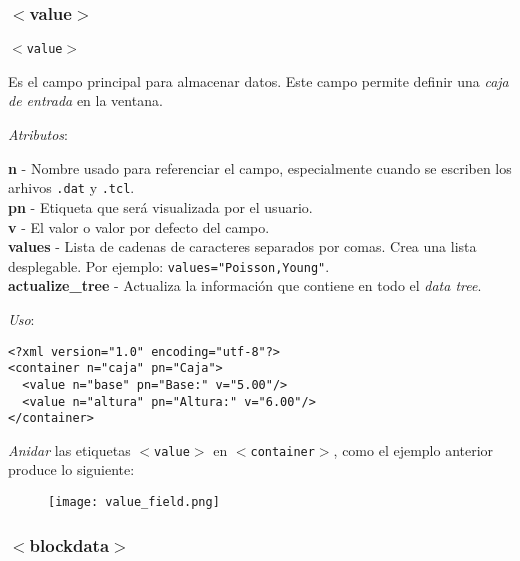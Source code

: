 \documentclass[10pt, a4paper, twocolumn]{article} %
\begin{document}
\subsubsection{$<$value$>$}
\label{subsubsec:value}
\vspace{0.20cm}
\begin{center}
	\texttt{$<$value$>$}
\end{center}
\vspace{0.20cm}

Es el campo principal para almacenar datos. Este campo permite definir una \textit{caja de entrada} en la ventana.

\vspace{0.15cm}
\textit{Atributos}:

\vspace{0.15cm}
	\textbf{n} - Nombre usado para referenciar el campo, especialmente cuando se escriben los arhivos \texttt{.dat} y \texttt{.tcl}.\\
	\textbf{pn} - Etiqueta que será visualizada por el usuario.\\
	\textbf{v} - El valor o valor por defecto del campo.\\
	\textbf{values} - Lista de cadenas de caracteres separados por comas. Crea una lista desplegable. Por ejemplo: \texttt{values="Poisson,Young"}.\\
	\textbf{actualize\_tree} - Actualiza la información que contiene en todo el \textit{data tree}.
\vspace{0.15cm}

\textit{Uso}:
\vspace{0.15cm}

\lstset{language=XML} 
\begin{lstlisting}
<?xml version="1.0" encoding="utf-8"?>
<container n="caja" pn="Caja">
  <value n="base" pn="Base:" v="5.00"/>
  <value n="altura" pn="Altura:" v="6.00"/>
</container>
\end{lstlisting}

\textit{Anidar} las etiquetas \texttt{$<$value$>$} en \texttt{$<$container$>$}, como el ejemplo anterior produce lo siguiente:

\begin{figure}[hbtp!]
	\centering
	\texttt{[image: value\_field.png]}
\end{figure}


\subsubsection{$<$blockdata$>$}
\end{document}
